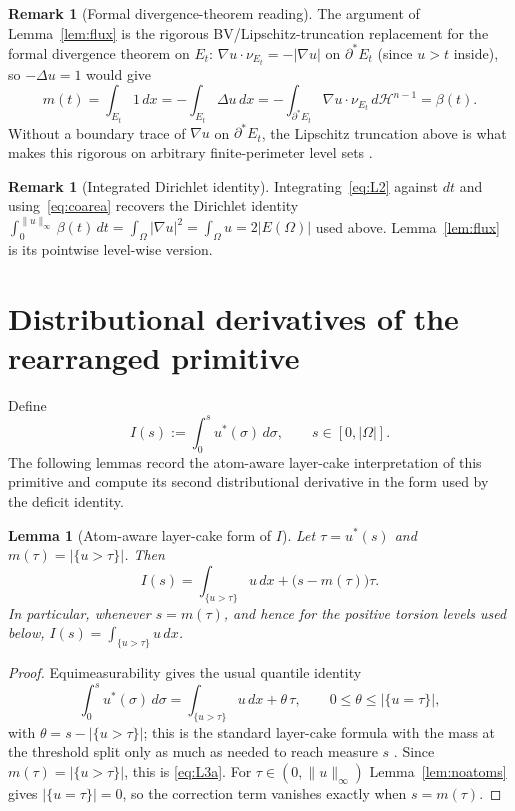 \documentclass[11pt]{article}
\newtheorem{lemma}[theorem]{Lemma}
\theoremstyle{definition}
\newtheorem{remark}[theorem]{Remark}
\newcommand{\Om}{\Omega}
\begin{document}
\begin{remark}[Formal divergence-theorem reading]\label{rem:divergence}
The argument of Lemma~\ref{lem:flux} is the rigorous BV/Lipschitz-truncation
replacement for the formal divergence theorem on $E_{t}$:
$\nabla u\cdot\nu_{E_{t}}=-|\nabla u|$ on $\partial^{*}E_{t}$ (since
$u>t$ inside), so $-\Delta u=1$ would give
\[
   m(t)=\int_{E_{t}}1\,dx=-\int_{E_{t}}\Delta u\,dx
   =-\int_{\partial^{*}E_{t}}\nabla u\cdot\nu_{E_{t}}\,d\mathcal H^{n-1}
   =\beta(t).
\]
Without a boundary trace of $\nabla u$ on $\partial^{*}E_{t}$, the
Lipschitz truncation above is what makes this rigorous on arbitrary
finite-perimeter level sets \cite[Ch.~17]{Maggi2012}.
\end{remark}

\begin{remark}[Integrated Dirichlet identity]
Integrating~\eqref{eq:L2} against $dt$ and using~\eqref{eq:coarea}
recovers the Dirichlet identity
$\int_{0}^{\|u\|_{\infty}}\beta(t)\,dt=\int_{\Om}|\nabla u|^{2}
=\int_{\Om}u=2|E(\Om)|$ used above. Lemma~\ref{lem:flux} is its
pointwise level-wise version.
\end{remark}

\section{Distributional derivatives of the rearranged primitive}
\label{sec:Iprimitive}

Define
\begin{equation}\label{eq:Idef}
   I(s):=\int_{0}^{s}u^{*}(\sigma)\,d\sigma,\qquad s\in[0,|\Om|].
\end{equation}
The following lemmas record the atom-aware layer-cake interpretation of
this primitive and compute its second distributional derivative in the
form used by the deficit identity.

\begin{lemma}[Atom-aware layer-cake form of $I$]\label{lem:I3a}
Let $\tau=u^{*}(s)$ and $m(\tau)=|\{u>\tau\}|$.  Then
\begin{equation}\label{eq:L3a}
   I(s)=\int_{\{u>\tau\}}u\,dx+\bigl(s-m(\tau)\bigr)\tau .
\end{equation}
In particular, whenever $s=m(\tau)$, and hence for the positive torsion
levels used below, $I(s)=\int_{\{u>\tau\}}u\,dx$.
\end{lemma}

\begin{proof}
Equimeasurability gives the usual quantile identity
\[
   \int_0^s u^*(\sigma)\,d\sigma
   =\int_{\{u>\tau\}}u\,dx+\theta\,\tau,
   \qquad
   0\le \theta\le |\{u=\tau\}|,
\]
with $\theta=s-|\{u>\tau\}|$; this is the standard layer-cake formula with
the mass at the threshold split only as much as needed to reach measure
$s$ \cite[\S 2]{Kawohl1985}.  Since $m(\tau)=|\{u>\tau\}|$, this is
\eqref{eq:L3a}.  For $\tau\in(0,\|u\|_\infty)$ Lemma~\ref{lem:noatoms}
gives $|\{u=\tau\}|=0$, so the correction term vanishes exactly when
$s=m(\tau)$.
\end{proof}
\end{document}
